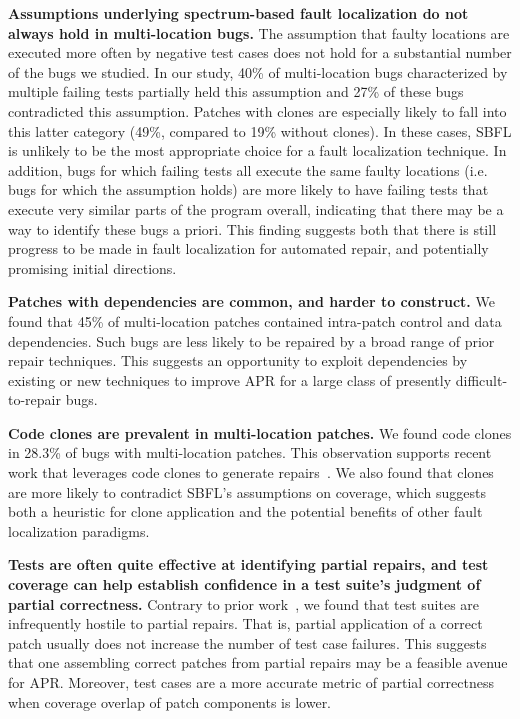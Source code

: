 \documentclass[10pt,journal,compsoc]{IEEEtran}
\begin{document}
\vspace{1ex}
\noindent\textbf{Assumptions underlying spectrum-based fault
  localization do not always hold in multi-location bugs.}
The assumption that faulty locations
are executed more often by negative test cases does not hold for a substantial
number of the bugs we studied. In our study, 40\% of multi-location bugs
characterized by multiple failing tests partially held this assumption and 27\% of
these bugs contradicted this assumption.
Patches with clones are especially likely 
to fall into this latter category (49\%, compared to 19\% without clones).
In these cases, SBFL is unlikely to be the most 
appropriate choice for a
fault localization technique. 
%
In addition, bugs for which failing tests all execute the same faulty locations (i.e. bugs for 
which the assumption holds) are more likely to have failing tests that execute very similar 
parts of the program overall, indicating that there may be a way to identify these bugs a priori.
This finding suggests both that there is still progress
to be made in fault localization for automated repair, and potentially promising initial directions.

\vspace{1ex}
\noindent\textbf{Patches with dependencies are common, and harder to construct.}
We found that 45\% of multi-location patches contained
intra-patch control and data dependencies. Such bugs are less likely to be
repaired by a broad range of prior repair techniques. 
This suggests an opportunity to exploit dependencies by
existing or new techniques to improve APR for a large class of presently difficult-to-repair
bugs.

\vspace{1ex}
\noindent\textbf{Code clones are prevalent in multi-location patches.}
We found code clones in 28.3\% of bugs with multi-location
patches. This observation supports recent work that leverages code clones to
generate repairs~\cite{saha2019harnessing}.
We also found that clones are more likely to contradict SBFL's assumptions 
on coverage, which suggests both a heuristic for clone application and the
potential benefits of other fault localization paradigms.

\vspace{1ex}
\noindent\textbf{Tests are
    often quite effective at identifying partial repairs, and test coverage can
    help establish confidence in a test suite's judgment of partial correctness.}
Contrary to prior work~\cite{gecco09}, we found that test suites are infrequently
hostile to partial repairs. That is, partial application of a correct patch
usually does not increase the number of test case failures. This suggests that
one assembling correct patches from partial repairs may be a feasible avenue for
APR.  
Moreover, test cases are a more accurate metric of partial correctness when coverage
overlap of patch components is lower.
\end{document}
